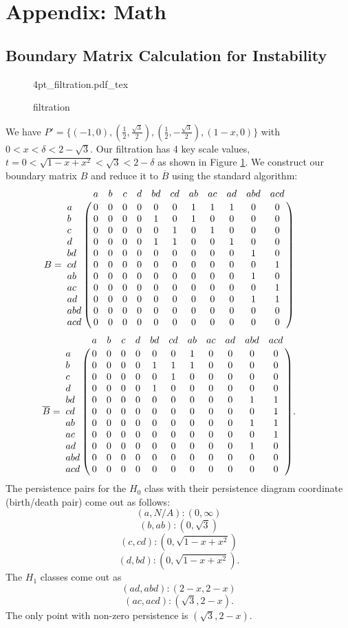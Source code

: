 \documentclass[letterpaper,titlepage]{article}
\newcommand{\incfig}[1]{%
    \def\svgwidth{\columnwidth}
    {#1.pdf_tex}
}
\begin{document}
\appendix
\section{Appendix: Math}

\subsection{Boundary Matrix Calculation for Instability}\label{boundary_mat}

\begin{figure}[ht]
    \centering
    \incfig{4pt_filtration}
    \caption{filtration}
    \label{fig:4pt_filtration}
\end{figure}

We have $P' = \{(-1,0),(\frac{1}{2},\frac{\sqrt{3}}{2}),(\frac{1}{2},-\frac{\sqrt{3}}{2}),(1-x,0)\}$ with $0< x < \delta < 2-\sqrt{3}$.
Our filtration has 4 key scale values, $t = 0<\sqrt{1-x+x^2}< \sqrt{3}< 2-\delta$ as shown in Figure \ref{fig:4pt_filtration}. We construct our boundary matrix $B$ and reduce it to $\overline{B}$ using the standard algorithm:
$$B=\bordermatrix{ 
    &   a & b & c & d & bd & cd & ab & ac & ad & abd & acd\cr
    a & 0 & 0 & 0 & 0 &  0 &  0 &  1 &  1 &  1 &   0 &   0 \cr
    b & 0 & 0 & 0 & 0 &  1 &  0 &  1 &  0 &  0 &   0 &   0\cr
    c & 0 & 0 & 0 & 0 &  0 &  1 &  0 &  1 &  0 &   0 &   0\cr
    d & 0 & 0 & 0 & 0 &  1 &  1 &  0 &  0 &  1 &   0 &   0\cr
   bd & 0 & 0 & 0 & 0 &  0 &  0 &  0 &  0 &  0 &   1 &   0\cr
   cd & 0 & 0 & 0 & 0 &  0 &  0 &  0 &  0 &  0 &   0 &   1\cr
   ab & 0 & 0 & 0 & 0 &  0 &  0 &  0 &  0 &  0 &   1 &   0\cr
   ac & 0 & 0 & 0 & 0 &  0 &  0 &  0 &  0 &  0 &   0 &   1\cr
   ad & 0 & 0 & 0 & 0 &  0 &  0 &  0 &  0 &  0 &   1 &   1\cr
  abd & 0 & 0 & 0 & 0 &  0 &  0 &  0 &  0 &  0 &   0 &   0\cr
  acd & 0 & 0 & 0 & 0 &  0 &  0 &  0 &  0 &  0 &   0 &   0\cr
    } \qquad$$
$$\overline{B}=\bordermatrix{ 
    &   a & b & c & d & bd & cd & ab & ac & ad & abd & acd\cr
    a & 0 & 0 & 0 & 0 &  0 &  0 &  1 &  0 &  0 &   0 &   0 \cr
    b & 0 & 0 & 0 & 0 &  1 &  1 &  1 &  0 &  0 &   0 &   0\cr
    c & 0 & 0 & 0 & 0 &  0 &  1 &  0 &  0 &  0 &   0 &   0\cr
    d & 0 & 0 & 0 & 0 &  1 &  0 &  0 &  0 &  0 &   0 &   0\cr
   bd & 0 & 0 & 0 & 0 &  0 &  0 &  0 &  0 &  0 &   1 &   1\cr
   cd & 0 & 0 & 0 & 0 &  0 &  0 &  0 &  0 &  0 &   0 &   1\cr
   ab & 0 & 0 & 0 & 0 &  0 &  0 &  0 &  0 &  0 &   1 &   1\cr
   ac & 0 & 0 & 0 & 0 &  0 &  0 &  0 &  0 &  0 &   0 &   1\cr
   ad & 0 & 0 & 0 & 0 &  0 &  0 &  0 &  0 &  0 &   1 &   0\cr
  abd & 0 & 0 & 0 & 0 &  0 &  0 &  0 &  0 &  0 &   0 &   0\cr
  acd & 0 & 0 & 0 & 0 &  0 &  0 &  0 &  0 &  0 &   0 &   0\cr
    }. \qquad$$
The persistence pairs for the $H_0$ class with their persistence diagram coordinate (birth/death pair) come out as follows:
$$(a,N/A): (0,\infty)$$
$$(b,ab): (0,\sqrt{3})$$
$$(c, cd): (0,\sqrt{1-x+x^2})$$
$$(d, bd): (0,\sqrt{1-x+x^2}).$$
The $H_1$ classes come out as
$$(ad, abd): (2-x, 2-x)$$
$$(ac, acd): (\sqrt{3}, 2-x).$$
The only point with non-zero persistence is $(\sqrt{3}, 2-x).$
\end{document}
